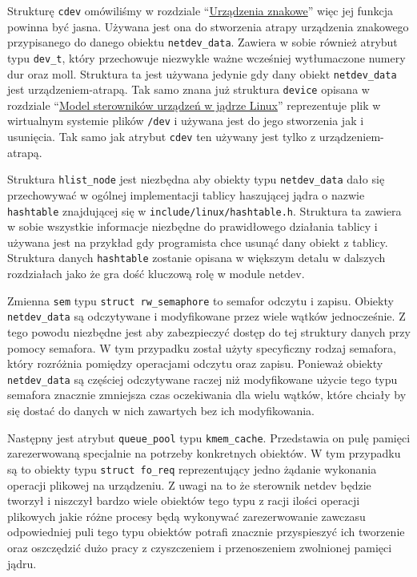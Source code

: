 Strukturę \texttt{cdev} omówiliśmy w rozdziale
``\hyperref[urządzenia-znakowe]{Urządzenia znakowe}'' więc jej funkcja
powinna być jasna. Używana jest ona do stworzenia atrapy urządzenia
znakowego przypisanego do danego obiektu \texttt{netdev\_data}. Zawiera
w sobie również atrybut typu \texttt{dev\_t}, który przechowuje
niezwykle ważne wcześniej wytłumaczone numery dur oraz moll. Struktura
ta jest używana jedynie gdy dany obiekt \texttt{netdev\_data} jest
urządzeniem-atrapą. Tak samo znana już struktura \texttt{device} opisana
w rozdziale ``\hyperref[model-sterowników-urządzeń-w-jądrze-linux]{Model
sterowników urządzeń w jądrze Linux}'' reprezentuje plik w wirtualnym
systemie plików \texttt{/dev} i używana jest do jego stworzenia jak i
usunięcia. Tak samo jak atrybut \texttt{cdev} ten używany jest tylko z
urządzeniem-atrapą.

Struktura \texttt{hlist\_node} jest niezbędna aby obiekty typu
\texttt{netdev\_data} dało się przechowywać w ogólnej implementacji
tablicy haszującej jądra o nazwie \texttt{hashtable} znajdującej się w
\texttt{include/linux/hashtable.h}. Struktura ta zawiera w sobie
wszystkie informacje niezbędne do prawidłowego działania tablicy i
używana jest na przykład gdy programista chce usunąć dany obiekt z
tablicy. Struktura danych \texttt{hashtable} zostanie opisana w większym
detalu w dalszych rozdziałach jako że gra dość kluczową rolę w module
netdev.

Zmienna \texttt{sem} typu \texttt{struct rw\_semaphore} to semafor
odczytu i zapisu. Obiekty \texttt{netdev\_data} są odczytywane i
modyfikowane przez wiele wątków jednocześnie. Z tego powodu niezbędne
jest aby zabezpieczyć dostęp do tej struktury danych przy pomocy
semafora. W tym przypadku został użyty specyficzny rodzaj semafora,
który rozróżnia pomiędzy operacjami odczytu oraz zapisu. Ponieważ
obiekty \texttt{netdev\_data} są częściej odczytywane raczej niż
modyfikowane użycie tego typu semafora znacznie zmniejsza czas
oczekiwania dla wielu wątków, które chciały by się dostać do danych w
nich zawartych bez ich modyfikowania.

Następny jest atrybut \texttt{queue\_pool} typu \texttt{kmem\_cache}.
Przedstawia on pulę pamięci zarezerwowaną specjalnie na potrzeby
konkretnych obiektów. W tym przypadku są to obiekty typu
\texttt{struct fo\_req} reprezentujący jedno żądanie wykonania operacji
plikowej na urządzeniu. Z uwagi na to że sterownik netdev będzie tworzył
i niszczył bardzo wiele obiektów tego typu z racji ilości operacji
plikowych jakie różne procesy będą wykonywać zarezerwowanie zawczasu
odpowiedniej puli tego typu obiektów potrafi znacznie przyspieszyć ich
tworzenie oraz oszczędzić dużo pracy z czyszczeniem i przenoszeniem
zwolnionej pamięci jądru.

